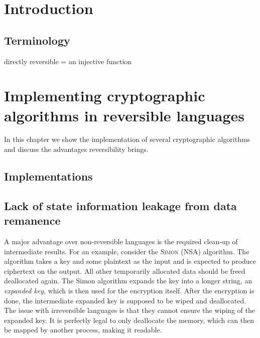 \documentclass[a4paper,10pt,openright]{memoir}
\newcommand{\name}[1]{\textsc{#1}}
\newcommand{\term}[1]{\textit{#1}}
\begin{document}
\chapter{Introduction}



\section{Terminology}

directly reversible = an injective function


\chapter{Implementing cryptographic algorithms in reversible languages}

In this chapter we show the implementation of several cryptographic 
algorithms and discuss the advantages reversibility brings.

\section{Implementations}


\section{Lack of state information leakage from data remanence}

A major advantage over non-reversible languages is the required 
clean-up of intermediate results. For an example, consider the 
\name{Simon} (NSA) algorithm. The algorithm takes a key and some 
plaintext as the input and is expected to produce ciphertext on the 
output. All other temporarily allocated data should be freed 
deallocated again. The Simon algorithm expands the key into a longer 
string, an \term{expanded key}, which is then used for the encryption 
itself. After the encryption is done, the intermediate expanded key is 
supposed to be wiped and deallocated. The issue with irreversible 
languages is that they cannot ensure the wiping of the expanded key. It 
is perfectly legal to only deallocate the memory, which can then be 
mapped by another process, making it readable. 
\end{document}
